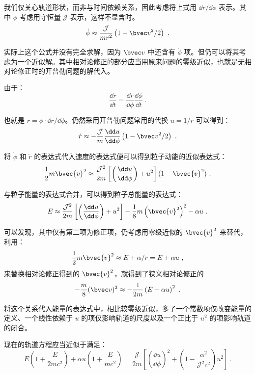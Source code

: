 我们仅关心轨道形状，而非与时间依赖关系，因此考虑将上式用 $\dd{r}/\dd{\phi}$ 表示。其中 $\phi$ 考虑用守恒量 $\mathcal J$ 表示，这样不显含时。
$$\dot \phi \approx \frac{\mathcal J}{mr^2} \left( 1-{\bvec v}^2/2 \right) ~.$$

实际上这个公式并没有完全求解，因为 $\bvec v$ 中还含有 $\dot \phi$ 项。但仍可以将其考虑为一个近似解。其中相对论修正的部分应当用原来问题的零级近似，也就是无相对论修正时的开普勒问题的解代入。

由于：
$$\frac{\dd r}{\dd t} = \frac{\dd r}{\dd \phi} \frac{\dd \phi} {\dd t}~.$$

也就是 $\dot r = \dot \phi \cdot \dd{r}/\dd{\phi}$。仍然采用开普勒问题常用的代换 $u = 1/r$ 可以得到：
\begin{equation}
\dot r \approx - \frac{\mathcal J}{m} \frac{\dd u}{\dd \phi} \left(1-{\bvec v}^2/2\right)
~.\end{equation}


将 $\dot \phi$ 和 $\dot r$ 的表达式代入速度的表达式便可以得到粒子动能的近似表达式：
\begin{equation}
\frac{1}{2} m \bvec{v}^2 \approx \frac{\mathcal J^2}{2m} \left[\left(\frac{\dd u}{\dd \phi}\right) + u^2\right] (1-\bvec{v}^2)~.
\end{equation}

与粒子能量的表达式合并，可以得到粒子总能量的表达式：
\begin{equation}
E \approx \frac{\mathcal J^2}{2 m} \left[ \left(\frac{\dd u}{\dd \phi}\right) + u^2 \right] - \frac{1}{8} m \left(\bvec{v}^2\right)^2 -\alpha u ~.
\end{equation}

可以发现，其中仅有第二项为修正项，仍考虑用零级近似的 $\bvec{v}^2$ 来替代，利用：
$$\frac{1}{2} m \bvec{v}^2 \approx E + \alpha / r = E + \alpha u ~,$$
来替换相对论修正得到的 $\bvec{v}^2$，就得到了狭义相对论修正的
\begin{equation}
-\frac{m}{8} (\bvec v)^2 \approx - \frac{1}{2m} \left(E + \alpha u\right)^2 ~.
\end{equation}

将这个关系代入能量的表达式中，相比较零级近似，多了一个常数项仅改变能量的定义、一个线性依赖于 $u$ 的项仅影响轨道的尺度以及一个正比于 $u^2$ 的项影响轨道的闭合。

现在的轨道方程应当近似于满足：
\begin{equation}
E\left(1 + \frac{E}{2mc^2}\right) + \alpha u \left(1 + \frac{E}{mc^2}\right) = \frac{\mathcal J}{2m} \left[ \left(\frac{\dd u}{\dd \phi}\right)^2 + \left( 1-\frac{\alpha^2}{\mathcal J^2 c^2} \right) u^2 \right]~.
\end{equation}

